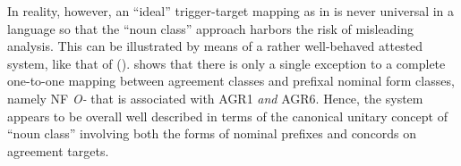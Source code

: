 \documentclass[output=collectionpaper]{langsci/langscibook}
\begin{document}
In reality, however, an ``ideal'' trigger-target mapping as in  is never universal in a language so that the ``noun class'' approach harbors the risk of misleading analysis. This can be illustrated by means of a rather well-behaved attested system, like that of  ().  shows that there is only a single exception to a complete one-to-one mapping between agreement classes and prefixal nominal form classes, namely NF \textit{O-} that is associated with AGR1 \emph{and} AGR6. Hence, the system appears to be overall well described in terms of the canonical unitary concept of ``noun class'' involving both the forms of nominal prefixes and concords on agreement targets.
%
%
%
%
%
%
%
%
%
\end{document}
